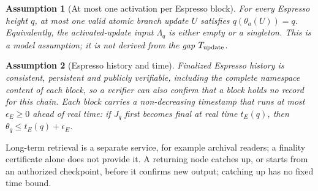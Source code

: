 \documentclass[11pt,a4paper]{article}
\newtheorem{assumption}[assumption]{Assumption}
\begin{document}
\begin{assumption}[At most one activation per Espresso block]
\label{ass:single-activation}
For every Espresso height $q$, at most one valid atomic branch update
$U$ satisfies $q(\theta_a(U))=q$. Equivalently, the activated-update
input $\Lambda_q$ is either empty or a singleton. This is a model
assumption; it is not derived from the gap $T_{\rm update}$.
\end{assumption}

\begin{assumption}[Espresso history and time]
\label{ass:espresso}
Finalized Espresso history is consistent, persistent and publicly
verifiable, including the complete namespace content of each block, so a
verifier can also confirm that a block holds no record for this chain.
Each block carries a non-decreasing timestamp that runs at most
$\epsilon_E\ge0$ ahead of real time: if $J_q$ first becomes final at real
time $t_E(q)$, then $\theta_q\le t_E(q)+\epsilon_E$.
\end{assumption}
Long-term retrieval is a separate service, for example archival readers;
a finality certificate alone does not provide it. A returning node
catches up, or starts from an authorized checkpoint, before it confirms
new output; catching up has no fixed time bound.
\end{document}
